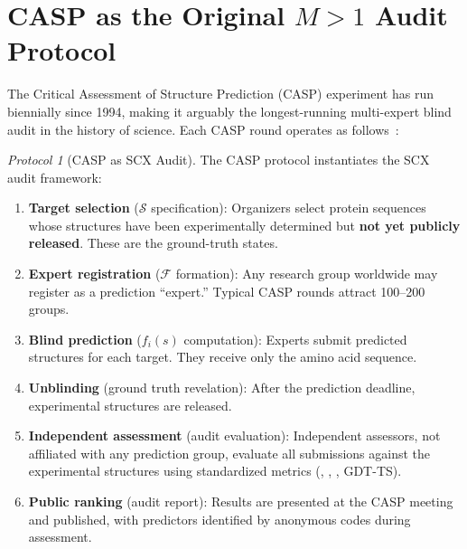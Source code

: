 \documentclass[12pt,a4paper]{article}
\theoremstyle{remark}
\newtheorem{protocol}[theorem]{Protocol}
\newcommand{\F}{\mathcal{F}}
\newcommand{\Sstruct}{\mathcal{S}}
\DeclareMathOperator{\RMSD}{RMSD}
\DeclareMathOperator{\TMscore}{TM\text{-}score}
\DeclareMathOperator{\lDDT}{lDDT}
\begin{document}
\section{CASP as the Original $M > 1$ Audit Protocol}
\label{sec:casp}

The Critical Assessment of Structure Prediction (CASP) experiment has run biennially since 1994, making it arguably the longest-running multi-expert blind audit in the history of science.
Each CASP round operates as follows~\cite{moult1995large, kryshtafovych2023critical}:

\begin{protocol}[CASP as SCX Audit]
\label{prot:casp}
The CASP protocol instantiates the SCX audit framework:
\begin{enumerate}[leftmargin=*,label=\textbf{Step \arabic*:}]
    \item \textbf{Target selection} ($\Sstruct$ specification): Organizers select protein sequences whose structures have been experimentally determined but \textbf{not yet publicly released}. These are the ground-truth states.
    \item \textbf{Expert registration} ($\F$ formation): Any research group worldwide may register as a prediction ``expert.'' Typical CASP rounds attract 100--200 groups.
    \item \textbf{Blind prediction} ($f_i(s)$ computation): Experts submit predicted structures for each target. They receive only the amino acid sequence.
    \item \textbf{Unblinding} (ground truth revelation): After the prediction deadline, experimental structures are released.
    \item \textbf{Independent assessment} (audit evaluation): Independent assessors, not affiliated with any prediction group, evaluate all submissions against the experimental structures using standardized metrics (\RMSD, \TMscore, \lDDT, GDT-TS).
    \item \textbf{Public ranking} (audit report): Results are presented at the CASP meeting and published, with predictors identified by anonymous codes during assessment.
\end{enumerate}
\end{protocol}
\end{document}
